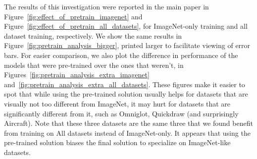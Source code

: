 \documentclass{article} \usepackage{iclr2020_conference,times}
\begin{document}
The results of this investigation were reported in the main paper in Figure~\ref{fig:effect_of_pretrain_imagenet} and Figure~\ref{fig:effect_of_pretrain_all_datasets}, for ImageNet-only training and all dataset training, respectively. 
We show the same results in Figure~\ref{fig:pretrain_analysis_bigger}, printed larger to facilitate viewing of error bars.
For easier comparison, we also plot the difference in performance of the models that were pre-trained over the ones that weren't, in Figures~\ref{fig:pretrain_analysis_extra_imagenet} and~\ref{fig:pretrain_analysis_extra_all_datasets}. These figures make it easier to spot that while using the pre-trained solution usually helps for datasets that are visually not too different from ImageNet, it may hurt for datasets that are significantly different from it, such as Omniglot, Quickdraw (and surprisingly Aircraft). Note that these three datasets are the same three that we found benefit from training on All datasets instead of ImageNet-only. It appears that using the pre-trained solution biases the final solution to specialize on ImageNet-like datasets. 
\begin{figure*}[htp]
   \centering
	\hspace{0.01cm}
	\hspace{0.01cm}
   \caption{\label{fig:pretrain_analysis_bigger} Comparing pre-training to starting from scratch. Same plots as Figure~\ref{fig:effect_of_pretrain_imagenet} and Figure~\ref{fig:effect_of_pretrain_all_datasets}, only larger.}
 \end{figure*}

\begin{figure*}[htp]
   \centering
	\hspace{0.01cm}
	\hspace{0.01cm}
   \caption{\label{fig:pretrain_analysis_extra} The performance difference of initializing the embedding weights from a pre-trained solution, before episodically training on ImageNet or all datasets, over using a random initialization of those weights. The pre-trained weights that we consider are the ones that the -NN baseline converged to when it was trained on ImageNet. Positive values indicate that this pre-training was beneficial.}
 \end{figure*}
\end{document}
